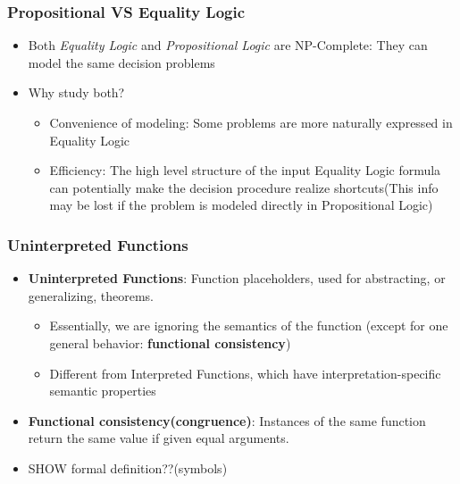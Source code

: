 \documentclass{beamer}
\begin{document}
\begin{frame}

 \frametitle{Propositional VS Equality Logic}
 
 \begin{itemize}
 \item Both \emph{Equality Logic} and \emph{Propositional Logic} are NP-Complete:  They can model the same decision problems
 \item Why study both?
 \begin {itemize}
 \item Convenience of modeling:  Some problems are more naturally expressed in Equality Logic
 \item Efficiency:  The high level structure of the input Equality Logic formula can potentially make the decision procedure realize shortcuts(This info may be lost if the problem is modeled directly in Propositional Logic)
 \end {itemize}
 
 \end{itemize}
 
\end{frame}


\begin{frame}

 \frametitle{Uninterpreted Functions}
 
 \begin{itemize}
 \item \textbf{Uninterpreted Functions}: Function placeholders, used for abstracting, or generalizing, theorems.    

\begin {itemize}
 \item Essentially, we are ignoring the semantics of the function (except for one general behavior:  \textbf{functional consistency})
 \item Different from Interpreted Functions, which have interpretation-specific semantic properties
 \end{itemize}
 
 \item \textbf{Functional consistency(congruence)}:  Instances of the same function return the same value if given equal arguments.
 
 \item SHOW formal definition??(symbols)
 \end{itemize}
\end{frame}
\end{document}
